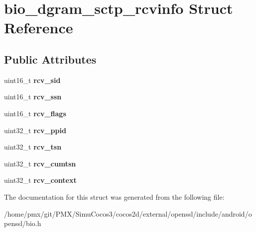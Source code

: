 \hypertarget{structbio__dgram__sctp__rcvinfo}{}\section{bio\+\_\+dgram\+\_\+sctp\+\_\+rcvinfo Struct Reference}
\label{structbio__dgram__sctp__rcvinfo}
\subsection*{Public Attributes}
\begin{DoxyCompactItemize}
\item 
\mbox{\label{structbio__dgram__sctp__rcvinfo_aaddad1a5b0f7b5fda8a0aeb8e5a6c63d}} 
uint16\+\_\+t {\bfseries rcv\+\_\+sid}
\item 
\mbox{\label{structbio__dgram__sctp__rcvinfo_a9cac7bdaa73e1d948a9485a5edd265ca}} 
uint16\+\_\+t {\bfseries rcv\+\_\+ssn}
\item 
\mbox{\label{structbio__dgram__sctp__rcvinfo_abfd14b07964648d311e581a5666d19b6}} 
uint16\+\_\+t {\bfseries rcv\+\_\+flags}
\item 
\mbox{\label{structbio__dgram__sctp__rcvinfo_a3ee7d864acf357f8165e8b988d6d8f54}} 
uint32\+\_\+t {\bfseries rcv\+\_\+ppid}
\item 
\mbox{\label{structbio__dgram__sctp__rcvinfo_adee218bef23543691b93d3e665a7e158}} 
uint32\+\_\+t {\bfseries rcv\+\_\+tsn}
\item 
\mbox{\label{structbio__dgram__sctp__rcvinfo_a6bfc2bacc606356cfdf1c00c71b2227e}} 
uint32\+\_\+t {\bfseries rcv\+\_\+cumtsn}
\item 
\mbox{\label{structbio__dgram__sctp__rcvinfo_aed041b41dfccd0bbb626d34cf03b36cb}} 
uint32\+\_\+t {\bfseries rcv\+\_\+context}
\end{DoxyCompactItemize}


The documentation for this struct was generated from the following file\+:\begin{DoxyCompactItemize}
\item 
/home/pmx/git/\+P\+M\+X/\+Simu\+Cocos3/cocos2d/external/openssl/include/android/openssl/bio.\+h\end{DoxyCompactItemize}
